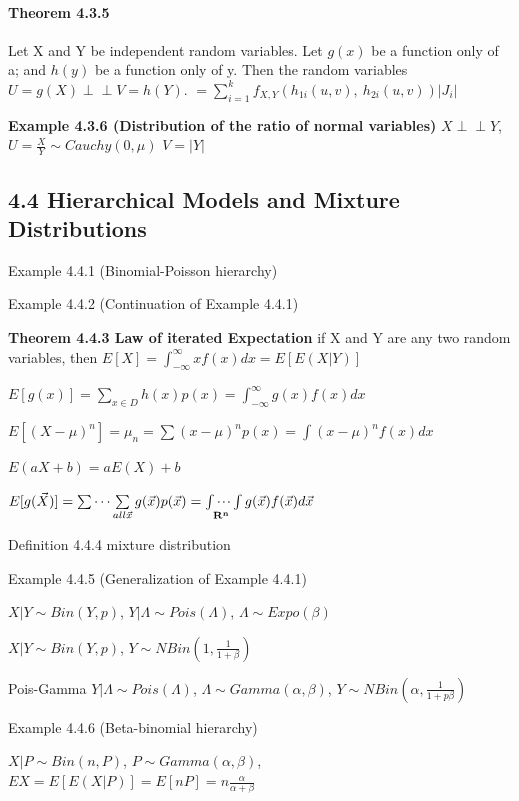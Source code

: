 \documentclass[6pt,twocolumn,Portrait]{article}
\let\oldparagraph\paragraph
\renewcommand{\paragraph}[1]{\oldparagraph{#1}\mbox{}}
\begin{document}
\hypertarget{indep-2}{%
\paragraph{\texorpdfstring{\textbf{Theorem
4.3.5}}{Theorem 4.3.5}}\label{indep-2}}

Let X and Y be independent random variables. Let \(g(x)\) be a function
only of a; and \(h(y)\) be a function only of y. Then the random
variables \(U=g(X)\perp\!\!\!\perp V=h(Y)\).
\(=\sum_{i=1}^kf_{X,Y}(h_{1i}(u,v),\ h_{2i}(u,v))|J_i|\)

\textbf{Example 4.3.6 (Distribution of the ratio of normal variables)}
\(X\perp\!\!\!\perp Y\),\(U=\frac{X}Y\sim Cauchy(0,\mu)\) \(V=|Y|\)

\hypertarget{hierarchical-models-and-mixture-distributions}{%
\subsection{4.4 Hierarchical Models and Mixture
Distributions}\label{hierarchical-models-and-mixture-distributions}}

Example 4.4.1 (Binomial-Poisson hierarchy)

Example 4.4.2 (Continuation of Example 4.4.1)

\textbf{Theorem 4.4.3 Law of iterated Expectation} if X and Y are any
two random variables, then
\(E[X]=\int_{-\infty}^{\infty}xf(x)dx=E[E(X|Y)]\)

\(E[g(x)]=\sum\limits_{x\in D}h(x)p(x)=\int_{-\infty}^{\infty}g(x)f(x)dx\)

\(E[(X-\mu)^n]=\mu_n=\sum{(x-\mu)^n}p(x)=\int{(x-\mu)^n}f(x)dx\)

\(E(aX+b)=aE(X)+b\)

\(E[g(\vec X)]=\sum\cdots\sum\limits_{all\vec x} g(\vec x)p(\vec x)=\idotsint\limits_{\mathbf{R^n}}g(\vec x)f(\vec x)d\vec x\)

Definition 4.4.4 mixture distribution

Example 4.4.5 (Generalization of Example 4.4.1)

\(X|Y\sim Bin(Y,p)\), \(Y|\Lambda\sim Pois(\Lambda)\),
\(\Lambda\sim Expo(\beta)\)

\(X|Y\sim Bin(Y,p)\), \(Y\sim NBin(1,\frac1{1+\beta})\)

Pois-Gamma \(Y|\Lambda\sim Pois(\Lambda)\),
\(\Lambda\sim Gamma(\alpha,\beta)\),
\(Y\sim NBin(\alpha,\frac1{1+p\beta})\)

Example 4.4.6 (Beta-binomial hierarchy)

\(X|P\sim Bin(n,P)\), \(P\sim Gamma(\alpha,\beta)\),
\(EX=E[E(X|P)]=E[nP]=n\frac{\alpha}{\alpha+\beta}\)
\end{document}
